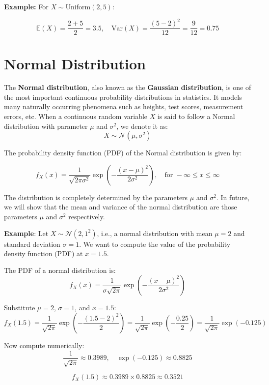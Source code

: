 \documentclass[twoside]{book}
\begin{document}
\vspace{2mm}

\textbf{Example:} For $X \sim \text{Uniform}(2, 5)$:

\[
\mathbb{E}(X) = \frac{2 + 5}{2} = 3.5, \quad \text{Var}(X) = \frac{(5 - 2)^2}{12} = \frac{9}{12} = 0.75
\]


\section{Normal Distribution}

The \textbf{Normal distribution}, also known as the \textbf{Gaussian distribution}, is one of the most important continuous probability distributions in statistics. It models many naturally occurring phenomena such as heights, test scores, measurement errors, etc. When a continuous random variable $X$ is said to follow a {Normal distribution} with parameter $\mu$ and $\sigma^2$, we denote it as:
\[
X \sim \mathcal{N}(\mu, \sigma^2)
\]

The probability density function (PDF) of the Normal distribution is given by:
\begin{textbox}
\[
f_X(x) = \frac{1}{\sqrt{2\pi\sigma^2}} \exp\left( -\frac{(x - \mu)^2}{2\sigma^2} \right), \quad \text{for } -\infty \leq x \leq \infty 
\]
\end{textbox}

The distribution is completely determined by the parameters $\mu$ and $\sigma^2$. In future, we will show that the mean and variance of the normal distribution are those parameters $\mu$ and $\sigma^2$ respectively.

\textbf{Example}: Let $X \sim \mathcal{N}(2, 1^2)$, i.e., a normal distribution with mean $\mu = 2$ and standard deviation $\sigma = 1$. 
We want to compute the value of the probability density function (PDF) at $x = 1.5$.

The PDF of a normal distribution is:
\[
f_X(x) = \frac{1}{\sigma\sqrt{2\pi }} \exp\left( -\frac{(x - \mu)^2}{2\sigma^2} \right)
\]

Substitute $\mu = 2$, $\sigma = 1$, and $x = 1.5$:
\[
f_X(1.5) = \frac{1}{\sqrt{2\pi}} \exp\left( -\frac{(1.5 - 2)^2}{2} \right)
= \frac{1}{\sqrt{2\pi}} \exp\left( -\frac{0.25}{2} \right)
= \frac{1}{\sqrt{2\pi}} \exp(-0.125)
\]

Now compute numerically:
\[
\frac{1}{\sqrt{2\pi}} \approx 0.3989, \quad \exp(-0.125) \approx 0.8825
\]

\[
f_X(1.5) \approx 0.3989 \times 0.8825 \approx 0.3521
\]
\end{document}
